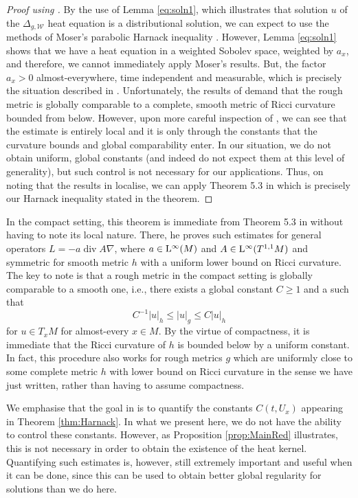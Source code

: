 \documentclass[a4paper, 12pt]{amsart}
\numberwithin{equation}{section}
\renewcommand{\~}{\tilde}
\renewcommand{\-}{\bar}
\newcommand{\8}{\infty}
\newcommand{\cW}{\mathcal{W}}
\newcommand{\modulus}[1]{|#1|}
\DeclareMathOperator{\divv}{div}		%
\newcommand{\Lp}[2][{}]{{\rm L}^{#2}_{\rm #1}}		%
\begin{document}
\begin{proof}[Proof using \cite{SC}]
By the use of Lemma \ref{eq:soln1}, which illustrates that solution $u$ of the $\Delta_{g,\cW}$ heat equation is a distributional solution, we can expect to use the methods of Moser's parabolic Harnack inequality \cite{MR0159139,MR0288405}. However, Lemma \ref{eq:soln1} shows that we have a heat equation in a weighted Sobolev space, weighted by $a_x$, and therefore, we cannot immediately apply Moser's results. But, the factor $a_x > 0$ almost-everywhere, time independent and measurable, which is precisely the situation described in \cite[Section 4]{SC}.  Unfortunately, the results of \cite{SC} demand that the rough metric is globally comparable to a complete, smooth metric of Ricci curvature bounded from below. However, upon more careful inspection of \cite{SC}, we can see that the estimate is entirely local and it is only through the constants that the curvature bounds and global comparability enter. In our situation, we do not obtain uniform, global constants (and indeed do not expect them at this level of generality), but such control is not necessary for our applications. Thus, on noting that the results in \cite{SC} localise, we can apply Theorem 5.3 in \cite{SC} which is precisely our Harnack inequality stated in the theorem.
\end{proof}

In the compact setting, this theorem 
is immediate from Theorem 5.3 in \cite{SC} without having to note
its local nature. There, 
he proves such estimates for general operators
$L = -a \divv A \nabla$, where $a \in \Lp{\infty}(M)$
and $A \in \Lp{\infty}(T^{1,1}M)$ and symmetric
for smooth metric $h$ with a uniform lower bound
on Ricci curvature.
The key to note is that a rough metric in the 
compact setting is globally comparable to a smooth one, 
i.e., there exists a global constant $C \geq 1$ 
and a 
such that
$$ C^{-1} \modulus{u}_{h} \leq \modulus{u}_g \leq C \modulus{u}_{h}$$
for $u \in T_x M$ for almost-every $x \in M$.
By the virtue of compactness, it is immediate
that the Ricci curvature of $h$ is bounded below
by a uniform constant. 
In fact, this procedure also works 
for rough metrics $g$ which 
are uniformly close to some complete metric $h$ with 
lower bound on Ricci curvature in the sense
we have just written, rather than having to assume compactness.

We emphasise that the goal in \cite{SC}
is to quantify the constants $C(t,U_x)$
appearing in Theorem \ref{thm:Harnack}. In what we present here, we do not have
the ability to control these constants. However, as
Proposition \ref{prop:MainRed} illustrates, this is not necessary 
in order to obtain the existence of the heat kernel.
Quantifying such estimates is, however, still 
extremely important and useful when it can be done, 
since this can be used to obtain better global regularity for
solutions than we do here.
\end{document}
